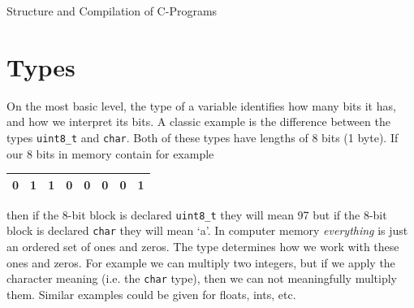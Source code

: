 %
%
%
%
%
%
%
%
%
%
%


\begin{center}
{\Large Structure and Compilation of C-Programs}
\end{center}

\section{Types}
On the most basic level, the type of a variable identifies how many
bits it has, and how we interpret its bits.   A classic example is
the difference between the types {\tt uint8\_t} and {\tt char}.  Both
of these types have lengths of 8 bits (1 byte).
If our 8 bits in memory contain
for example

\vspace{0.1in}\begin{center}
\begin{tabular}{|c|c|c|c|c|c|c|c|}
\hline
0&1&1&0&0&0&0&1\\\hline
\end{tabular}\end{center}
\vspace{0.1in}

then if the 8-bit block is declared {\tt uint8\_t} they will mean 97
but if the 8-bit block  is declared {\tt char}
they will mean `a'.  In computer memory {\it everything} is just
an ordered set of ones and zeros.  The type determines how we
work with these ones and zeros.  For example we can multiply two
integers,
but if we apply the character meaning (i.e. the {\tt char} type),
then we can not meaningfully multiply them.
Similar examples could be given for floats, ints,
etc.

